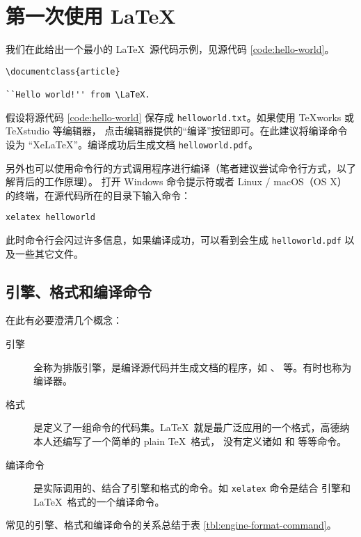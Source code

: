 \section{第一次使用 \LaTeX}\label{sec:run}

我们在此给出一个最小的 \LaTeX\ 源代码示例，见源代码 \ref{code:hello-world}。

\begin{sourcecode}[htp]
\begin{Verbatim}
\documentclass{article}

``Hello world!'' from \LaTeX.

\end{Verbatim}
\caption{\LaTeX\ 的一个最简单的源代码示例。}\label{code:hello-world}
\end{sourcecode}

假设将源代码 \ref{code:hello-world} 保存成 \texttt{helloworld.txt}。如果使用 \TeX works 或 \TeX studio 等编辑器，
点击编辑器提供的“编译”按钮即可。在此建议将编译命令设为 “XeLaTeX”。编译成功后生成文档 \texttt{helloworld.pdf}。

另外也可以使用命令行的方式调用程序进行编译（笔者建议尝试命令行方式，以了解背后的工作原理）。
打开 Windows 命令提示符或者 Linux / macOS（OS X）的终端，在源代码所在的目录下输入命令：
\begin{verbatim}
xelatex helloworld
\end{verbatim}
此时命令行会闪过许多信息，如果编译成功，可以看到会生成 \texttt{helloworld.pdf} 以及一些其它文件。

\subsection{引擎、格式和编译命令}\label{subsec:concepts}

在此有必要澄清几个概念：
\begin{description}
  \item[引擎] 全称为排版引擎，是编译源代码并生成文档的程序，如 、 等。有时也称为编译器。
  \item[格式] 是定义了一组命令的代码集。\LaTeX\ 就是最广泛应用的一个格式，高德纳本人还编写了一个简单的 plain \TeX\ 格式，
  没有定义诸如  和  等等命令。
  \item[编译命令] 是实际调用的、结合了引擎和格式的命令。如 \texttt{xelatex} 命令是结合  
  引擎和 \LaTeX\ 格式的一个编译命令。
\end{description}
常见的引擎、格式和编译命令的关系总结于表 \ref{tbl:engine-format-command}。


